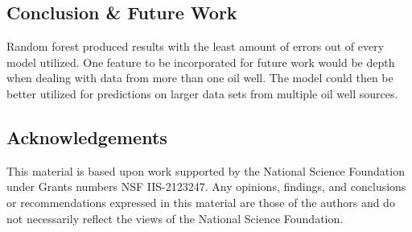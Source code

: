 \documentclass{a0poster}
\begin{document}
\begin{multicols}{3}
\begin{minipage}[t]{.96\linewidth}
\vspace{1.2cm}
    \vspace{.2cm}
  \begin{minipage}[t]{.96\linewidth}
    \begin{center}
    \section*{Conclusion \& Future Work}
    \end{center}
   {\large Random forest produced results with the least amount of errors out of every model utilized. One feature to be incorporated for future work would be depth when dealing with data from more than one oil well. The model could then be better utilized for predictions on larger data sets from multiple oil well sources.} 
   \vspace{.05cm} 

\vspace{.4cm}

\noindent
\begin{center}
\end{center}
\end{minipage}
\end{minipage}

\end{multicols}

 \vspace{-1.25cm}
\begin{minipage}[t]{.9756\linewidth}
\begin{center}
\noindent
\section*{Acknowledgements}
\vspace{-.45cm}
This material is based upon work supported by the National Science Foundation under Grants numbers NSF IIS-2123247.
Any opinions, findings, and conclusions or recommendations expressed in this material are those of the authors and do not necessarily
reflect the views of the National Science Foundation.
\end{center}
\end{minipage}
\end{document}
